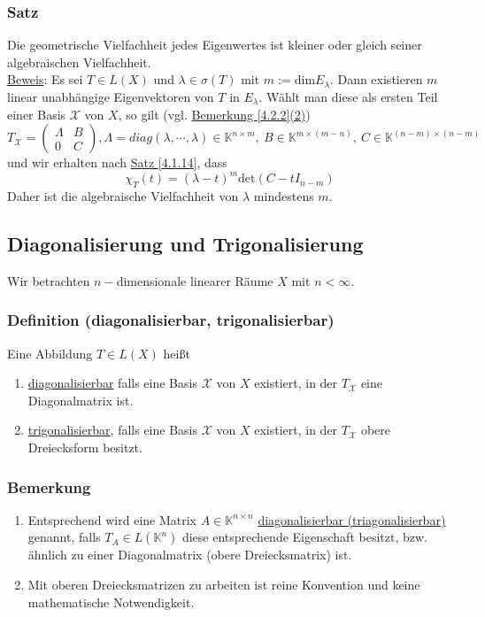 \subsubsection{Satz}
\label{4.3.7}
Die geometrische Vielfachheit jedes Eigenwertes ist kleiner oder gleich seiner algebraischen Vielfachheit.\\
\underline{Beweis}: Es sei $T\in L(X)$ und $\lambda \in \sigma (T)$ mit $m:=$dim$E_\lambda$.  Dann existieren $m$ linear unabhängige Eigenvektoren von $T$ in $E_\lambda$.  Wählt man diese als ersten Teil einer Basis $\mathcal{X}$ von $X$, so gilt (vgl. \hyperref[4.2.2]{Bemerkung \ref{4.2.2}(2)})
\[T_\mathcal{X} =\begin{pmatrix}\Lambda & B\\ 0 & C\end{pmatrix}, \Lambda=diag(\lambda ,\cdots ,\lambda )\in\mathbb{K}^{n\times m},\ B\in\mathbb{K}^{m\times (m-n)},\ C\in\mathbb{K}^{(n-m)\times (n-m)}\]
und wir erhalten nach \hyperref[4.1.14]{Satz \ref{4.1.14}}, dass
\[\chi _T(t)=(\lambda -t)^m \mathrm{det}(C-tI_{n-m})\]
Daher ist die algebraische Vielfachheit von $\lambda$ mindestens $m$.
\subsection{Diagonalisierung und Trigonalisierung}
Wir betrachten $n-$dimensionale linearer Räume $X$ mit $n<\infty$.
\subsubsection{Definition (diagonalisierbar, trigonalisierbar)}
Eine Abbildung $T\in L(X)$ heißt
\renewcommand{\labelenumi}{(\alph{enumi})}
\begin{enumerate}
\item \underline{diagonalisierbar} falls eine Basis $\mathcal{X}$ von $X$ existiert, in der $T_\mathcal{X}$ eine Diagonalmatrix ist.
\item \underline{trigonalisierbar}, falls eine Basis $\mathcal{X}$ von $X$ existiert, in der $T_\mathcal{X}$ obere Dreiecksform besitzt.
\end{enumerate}
\subsubsection{Bemerkung}
\renewcommand{\labelenumi}{(\arabic{enumi})}
\begin{enumerate}
\item Entsprechend wird eine Matrix $A\in \mathbb{K}^{n\times n}$ \underline{diagonalisierbar (triagonalisierbar)} genannt, falls $T_A\in L(\mathbb{K}^n)$ diese entsprechende Eigenschaft besitzt, bzw. ähnlich zu einer Diagonalmatrix (obere Dreiecksmatrix) ist.
\item Mit oberen Dreiecksmatrizen zu arbeiten ist reine Konvention und keine mathematische Notwendigkeit.
\end{enumerate}
